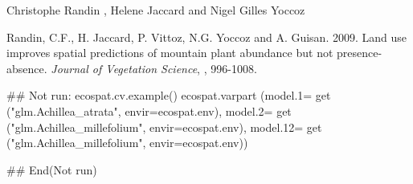 \documentclass[a4paper]{book}
\begin{document}
%
\begin{Author}\relax
Christophe Randin , Helene Jaccard and Nigel Gilles Yoccoz
\end{Author}
%
\begin{References}\relax
Randin, C.F., H. Jaccard, P. Vittoz, N.G. Yoccoz and A. Guisan. 2009. Land use improves spatial predictions of mountain plant abundance but not presence-absence. \emph{Journal of Vegetation Science}, , 996-1008.
\end{References}
%
\begin{Examples}
\begin{ExampleCode}
## Not run: 
ecospat.cv.example()
ecospat.varpart (model.1= get ("glm.Achillea_atrata", envir=ecospat.env), 
model.2= get ("glm.Achillea_millefolium", envir=ecospat.env), 
model.12= get ("glm.Achillea_millefolium", envir=ecospat.env))

## End(Not run)
\end{ExampleCode}
\end{Examples}
\printindex{}
\end{document}
